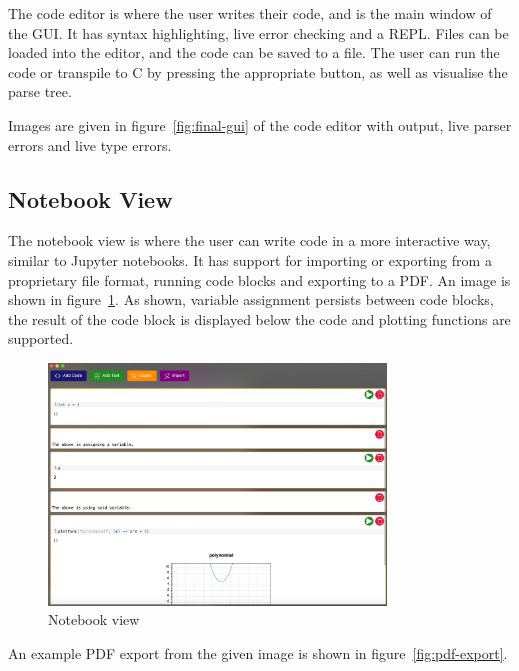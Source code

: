 The code editor is where the user writes their code, and is the main window of the GUI\@.
It has syntax highlighting, live error checking and a REPL\@.
Files can be loaded into the editor, and the code can be saved to a file.
The user can run the code or transpile to C by pressing the appropriate button, as well as visualise the parse tree.

Images are given in figure~\ref{fig:final-gui} of the code editor with output, live parser errors and live type errors.

\subsection{Notebook View}\label{subsec:notebook-view}

The notebook view is where the user can write code in a more interactive way, similar to Jupyter notebooks\citep{Jupyter}.
It has support for importing or exporting from a proprietary file format, running code blocks and exporting to a PDF\@.
An image is shown in figure~\ref{fig:notebook-view}.
As shown, variable assignment persists between code blocks, the result of the code block is displayed below the code
and plotting functions are supported.

\begin{figure}[H]
    \centering 
    \includegraphics[width=0.8\textwidth]{assets/finalNotebook}
    \caption{Notebook view}\label{fig:notebook-view}
\end{figure}

An example PDF export from the given image is shown in figure~\ref{fig:pdf-export}.

